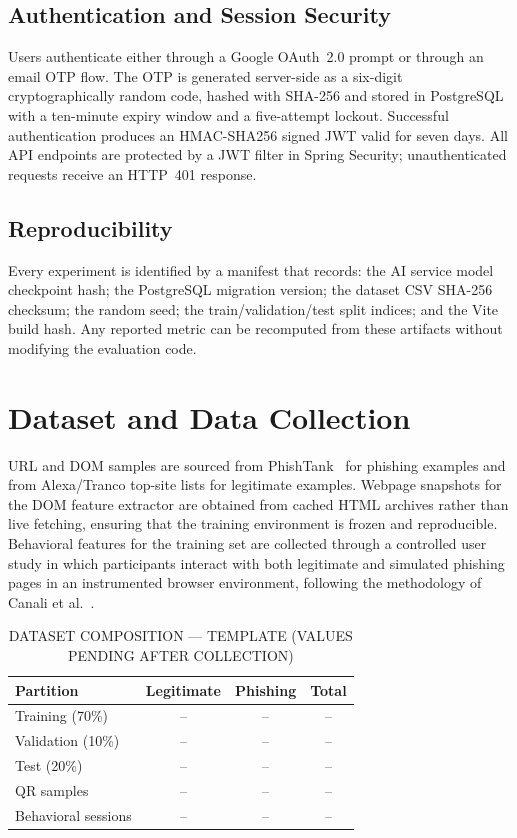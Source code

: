 \documentclass[conference]{IEEEtran}
\begin{document}
\subsection{Authentication and Session Security}
Users authenticate either through a Google OAuth~2.0 prompt or through an email OTP flow.
The OTP is generated server-side as a six-digit cryptographically random code, hashed with
SHA-256 and stored in PostgreSQL with a ten-minute expiry window and a five-attempt lockout.
Successful authentication produces an HMAC-SHA256 signed JWT valid for seven days.
All API endpoints are protected by a JWT filter in Spring Security; unauthenticated requests
receive an HTTP~401 response.

\subsection{Reproducibility}
Every experiment is identified by a manifest that records: the AI service model checkpoint hash;
the PostgreSQL migration version; the dataset CSV SHA-256 checksum; the random seed; the
train/validation/test split indices; and the Vite build hash.
Any reported metric can be recomputed from these artifacts without modifying the evaluation code.

\section{Dataset and Data Collection}

URL and DOM samples are sourced from PhishTank~\cite{ref18} for phishing examples and from
Alexa/Tranco top-site lists for legitimate examples.
Webpage snapshots for the DOM feature extractor are obtained from cached HTML archives rather
than live fetching, ensuring that the training environment is frozen and reproducible.
Behavioral features for the training set are collected through a controlled user study in which
participants interact with both legitimate and simulated phishing pages in an instrumented browser
environment, following the methodology of Canali et al.~\cite{ref12}.

\begin{table}[!t]
\caption{DATASET COMPOSITION --- TEMPLATE (VALUES PENDING AFTER COLLECTION)}
\label{tab:data}
\centering
\scriptsize
\setlength{\tabcolsep}{3pt}
\begin{tabular}{|l|c|c|c|}
\hline
\textbf{Partition} & \textbf{Legitimate} & \textbf{Phishing} & \textbf{Total} \\ \hline
Training (70\%)     & -- & -- & -- \\ \hline
Validation (10\%)   & -- & -- & -- \\ \hline
Test (20\%)         & -- & -- & -- \\ \hline
QR samples          & -- & -- & -- \\ \hline
Behavioral sessions & -- & -- & -- \\ \hline
\end{tabular}
\end{table}
\end{document}
